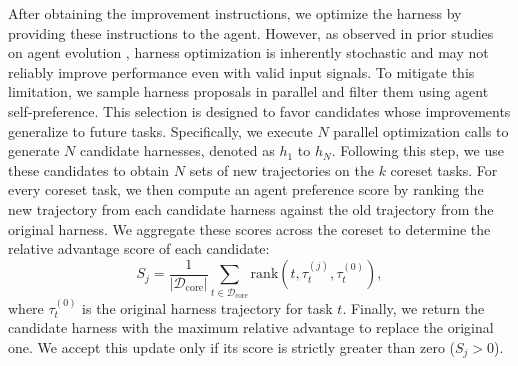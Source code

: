 After obtaining the improvement instructions, we optimize the harness by providing these instructions to the agent.
However, as observed in prior studies on agent evolution \citep{agrawal2025gepa,hu2024adas,lee2026metaharness}, harness optimization is inherently stochastic and may not reliably improve performance even with valid input signals.
To mitigate this limitation, we sample harness proposals in parallel and filter them using agent self-preference.
This selection is designed to favor candidates whose improvements generalize to future tasks.
Specifically, we execute $N$ parallel optimization calls to generate $N$ candidate harnesses, denoted as $h_1$ to $h_N$.
Following this step, we use these candidates to obtain $N$ sets of new trajectories on the $k$ coreset tasks.
For every coreset task, we then compute an agent preference score by ranking the new trajectory from each candidate harness against the old trajectory from the original harness.
We aggregate these scores across the coreset to determine the relative advantage score of each candidate:
\[
    S_j = \frac{1}{|\mathcal{D}_{\mathrm{core}}|}
    \sum_{t \in \mathcal{D}_{\mathrm{core}}}
    \mathrm{rank}\!\left(t, \tau_{t}^{(j)}, \tau_{t}^{(0)}\right),
\]
where $\tau_{t}^{(0)}$ is the original harness trajectory for task $t$.
Finally, we return the candidate harness with the maximum relative advantage to replace the original one.
We accept this update only if its score is strictly greater than zero ($S_j > 0$).
